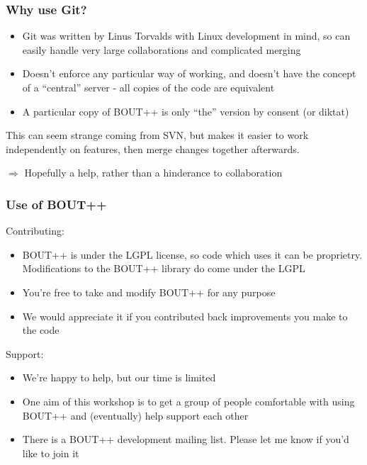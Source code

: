 \documentclass{beamer}
\begin{document}
\begin{frame}
  \frametitle{Why use Git?}
  
  \begin{itemize}
  \item Git was written by Linus Torvalds with Linux development in mind, so
    can easily handle very large collaborations and complicated merging
  \item Doesn't enforce any particular way of working, and doesn't have
    the concept of a ``central'' server - all copies of the code are equivalent
  \item A particular copy of BOUT++ is only ``the'' version by consent (or diktat)
  \end{itemize}
  
  This can seem strange coming from SVN, but makes it easier to work
  independently on features, then merge changes together afterwards.
  
  $\Rightarrow$ Hopefully a help, rather than a hinderance to collaboration
\end{frame}

\begin{frame}
  \frametitle{Use of BOUT++}
  
  Contributing:
  \begin{itemize}
  \item BOUT++ is under the LGPL license, so code which uses it can be proprietry. Modifications to the BOUT++ library do come under the LGPL
  \item You're free to take and modify BOUT++ for any purpose
  \item We would appreciate it if you contributed back improvements
    you make to the code
  \end{itemize}
  
  \pause
  
  Support:
  \begin{itemize}
  \item We're happy to help, but our time is limited
  \item One aim of this workshop is to get a group of people comfortable with
    using BOUT++ and (eventually) help support each other
  \item There is a BOUT++ development mailing list. Please let me know 
    if you'd like to join it
  \end{itemize}
\end{frame}
\end{document}
